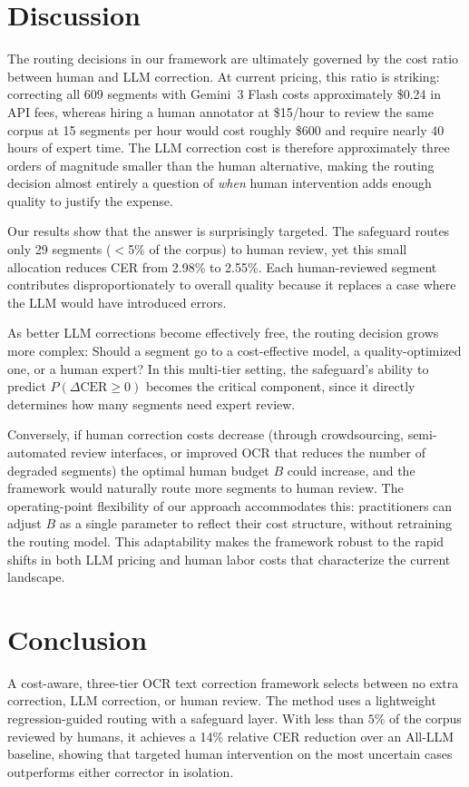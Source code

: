 \documentclass[sigconf]{acmart}
\begin{document}
\section{Discussion}

The routing decisions in our framework are ultimately governed by the cost ratio between human and LLM correction. At current pricing, this ratio is striking: correcting all 609 segments with Gemini~3 Flash costs approximately \$0.24 in API fees, whereas hiring a human annotator at \$15/hour to review the same corpus at 15 segments per hour would cost roughly \$600 and require nearly 40 hours of expert time. The LLM correction cost is therefore approximately three orders of magnitude smaller than the human alternative, making the routing decision almost entirely a question of \emph{when} human intervention adds enough quality to justify the expense.

Our results show that the answer is surprisingly targeted. The safeguard routes only 29 segments ($<$5\% of the corpus) to human review, yet this small allocation reduces CER from 2.98\% to 2.55\%. Each human-reviewed segment contributes disproportionately to overall quality because it replaces a case where the LLM would have introduced errors.

As better LLM corrections become effectively free, the routing decision grows more complex: Should a segment go to a cost-effective model, a quality-optimized one, or a human expert? In this multi-tier setting, the safeguard's ability to predict $P(\Delta\text{CER} \geq 0)$ becomes the critical component, since it directly determines how many segments need expert review.

Conversely, if human correction costs decrease (through crowdsourcing, semi-automated review interfaces, or improved OCR that reduces the number of degraded segments) the optimal human budget $B$ could increase, and the framework would naturally route more segments to human review. The operating-point flexibility of our approach accommodates this: practitioners can adjust $B$ as a single parameter to reflect their cost structure, without retraining the routing model. This adaptability makes the framework robust to the rapid shifts in both LLM pricing and human labor costs that characterize the current landscape.

\section{Conclusion}
A cost-aware, three-tier OCR text correction framework selects between no extra correction, LLM correction, or human review. The method uses a lightweight regression-guided routing with a safeguard layer. With less than $5\%$ of the corpus reviewed by humans, it achieves a 14\% relative CER reduction over an All-LLM baseline, showing that targeted human intervention on the most uncertain cases outperforms either corrector in isolation.
\end{document}
